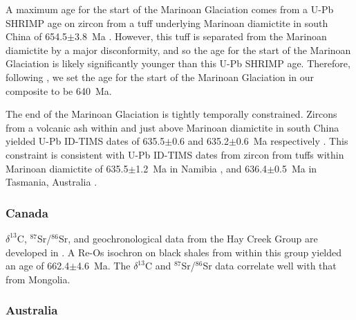 \documentclass[11pt,letterpaper]{article}
\newcommand{\dC}{$\delta^{13}$C\xspace}
\newcommand{\SrSr}{$^{87}$Sr/$^{86}$Sr\xspace}
\begin{document}
A maximum age for the start of the Marinoan Glaciation comes from a U-Pb SHRIMP age on zircon from a tuff underlying Marinoan diamictite in south China of 654.5$\pm$3.8~Ma \citep{Zhang2008b}. However, this tuff is separated from the Marinoan diamictite by a major disconformity, and so the age for the start of the Marinoan Glaciation is likely significantly younger than this U-Pb SHRIMP age. Therefore, following \citet{Bold2016a}, we set the age for the start of the Marinoan Glaciation in our composite to be 640~Ma.

The end of the Marinoan Glaciation is tightly temporally constrained. Zircons from a volcanic ash within and just above Marinoan diamictite in south China yielded U-Pb ID-TIMS dates of 635.5$\pm$0.6 and 635.2$\pm$0.6~Ma respectively \citep{Condon2005a}. This constraint is consistent with U-Pb ID-TIMS dates from zircon from tuffs within Marinoan diamictite of 635.5$\pm$1.2~Ma in Namibia \citep{Hoffmann2004a}, and 636.4$\pm$0.5~Ma in Tasmania, Australia \citep{Calver2013a}.

\subsubsection*{Canada}

\dC, \SrSr, and geochronological data from the Hay Creek Group are developed in \citet{Rooney2014a}. A Re-Os isochron on black shales from within this group yielded an age of 662.4$\pm$4.6~Ma. The \dC and \SrSr data correlate well with that from Mongolia.

\subsubsection*{Australia}
\end{document}
